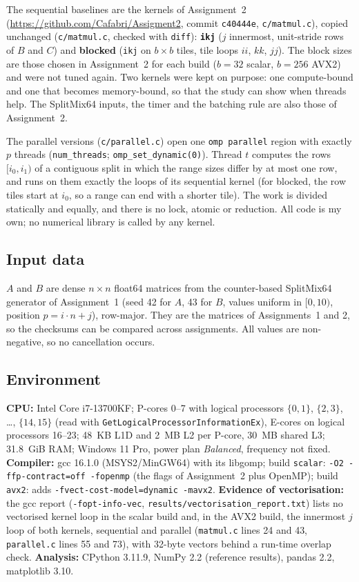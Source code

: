 \documentclass[11pt,a4paper]{article}
\begin{document}
The sequential baselines are the kernels of Assignment~2
(\url{https://github.com/Cafabri/Assigment2}, commit \texttt{c40444e}, \texttt{c/matmul.c}),
copied unchanged (\texttt{c/matmul.c}, checked with \texttt{diff}): \textbf{\texttt{ikj}}
($j$ innermost, unit-stride rows of $B$ and $C$) and \textbf{blocked} (\texttt{ikj} on
$b \times b$ tiles, tile loops $ii$, $kk$, $jj$). The block sizes are those chosen in
Assignment~2 for each build ($b = 32$ scalar, $b = 256$ AVX2) and were not tuned again. Two
kernels were kept on purpose: one compute-bound and one that becomes memory-bound, so that
the study can show when threads help. The SplitMix64 inputs, the timer and the batching rule
are also those of Assignment~2.

The parallel versions (\texttt{c/parallel.c}) open one \texttt{omp parallel} region with
exactly $p$ threads (\texttt{num\_threads}; \texttt{omp\_set\_dynamic(0)}). Thread $t$
computes the rows $[i_0, i_1)$ of a contiguous split in which the range sizes differ by at
most one row, and runs on them exactly the loops of its sequential kernel (for blocked, the
row tiles start at $i_0$, so a range can end with a shorter tile). The work is divided
statically and equally, and there is no lock, atomic or reduction. All code is my own; no
numerical library is called by any kernel.

\subsection{Input data}

$A$ and $B$ are dense $n \times n$ float64 matrices from the counter-based SplitMix64
generator of Assignment~1 (seed 42 for $A$, 43 for $B$, values uniform in $[0, 10)$,
position $p = i \cdot n + j$), row-major. They are the matrices of Assignments~1 and 2, so
the checksums can be compared across assignments. All values are non-negative, so no
cancellation occurs.

\subsection{Environment}

\textbf{CPU:} Intel Core i7-13700KF; P-cores 0--7 with logical processors $\{0,1\}$,
$\{2,3\}$, \dots, $\{14,15\}$ (read with \texttt{GetLogicalProcessorInformationEx}), E-cores
on logical processors 16--23; 48~KB L1D and 2~MB L2 per P-core, 30~MB shared L3; 31.8~GiB
RAM; Windows 11 Pro, power plan \textit{Balanced}, frequency not fixed. \textbf{Compiler:}
gcc 16.1.0 (MSYS2/MinGW64) with its libgomp; build \texttt{scalar}:
\texttt{-O2 -ffp-contract=off -fopenmp} (the flags of Assignment~2 plus OpenMP); build
\texttt{avx2}: adds \texttt{-fvect-cost-model=dynamic -mavx2}. \textbf{Evidence of
vectorisation:} the gcc report (\texttt{-fopt-info-vec},
\texttt{results/vectorisation\_report.txt}) lists no vectorised kernel loop in the scalar
build and, in the AVX2 build, the innermost $j$ loop of both kernels, sequential and
parallel (\texttt{matmul.c} lines 24 and 43, \texttt{parallel.c} lines 55 and 73), with
32-byte vectors behind a run-time overlap check. \textbf{Analysis:} CPython 3.11.9, NumPy
2.2 (reference results), pandas 2.2, matplotlib 3.10.
\end{document}
